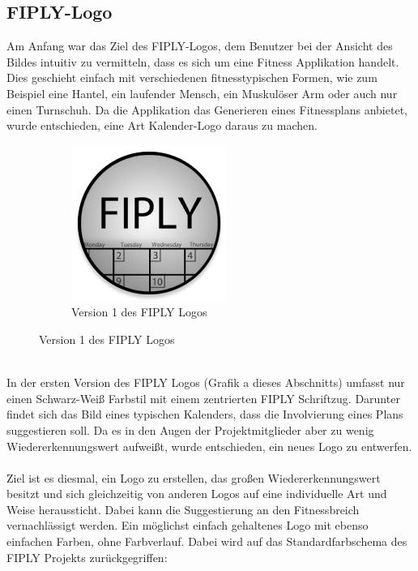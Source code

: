 \documentclass[FIPLY_base.tex]{subfiles}
\begin{document}
	\subsection{FIPLY-Logo} 
	Am Anfang war das Ziel des FIPLY-Logos, dem Benutzer bei der Ansicht des Bildes intuitiv zu vermitteln, dass es sich um eine Fitness Applikation handelt. Dies geschieht einfach mit verschiedenen fitnesstypischen Formen, wie zum Beispiel eine Hantel, ein laufender Mensch, ein Muskulöser Arm oder auch nur einen Turnschuh. Da die Applikation das Generieren eines Fitnessplans anbietet, wurde entschieden, eine Art Kalender-Logo daraus zu machen. 
	\begin{figure}[H]
		\begin{subfigure}[b]{1\textwidth}
			\centering
			\includegraphics[scale=1]{img/icons/Version1}
			\centering
			\caption{Version 1 des FIPLY Logos}
		\end{subfigure}
	\end{figure}
	\ \\
	In der ersten Version des FIPLY Logos (Grafik a dieses Abschnitts) umfasst nur einen Schwarz-Weiß Farbstil mit einem zentrierten \grqq{}FIPLY\grqq{} Schriftzug. Darunter findet sich das Bild eines typischen Kalenders, dass die Involvierung eines Plans suggestieren soll. Da es in den Augen der Projektmitglieder aber zu wenig Wiedererkennungswert aufweißt, wurde entschieden, ein neues Logo zu entwerfen. 
	\ \\
	Ziel ist es diesmal, ein Logo zu erstellen, das großen Wiedererkennungswert besitzt und sich gleichzeitig von anderen Logos auf eine individuelle Art und Weise heraussticht. Dabei kann die Suggestierung an den Fitnessbreich vernachlässigt werden. Ein möglichst einfach gehaltenes Logo mit ebenso einfachen Farben, ohne Farbverlauf. Dabei wird auf das Standardfarbschema des FIPLY Projekts zurückgegriffen:
\end{document}
